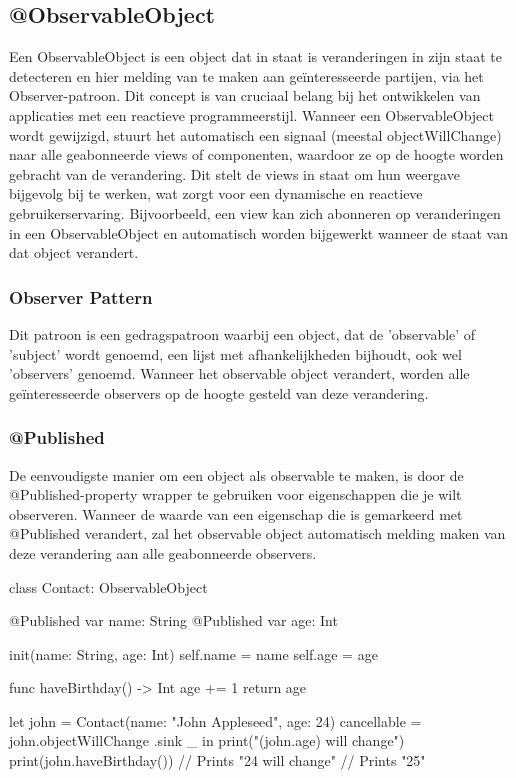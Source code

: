 \subsection{@ObservableObject}
\autocite{AppleObservableObject} Een ObservableObject is een object dat in staat is veranderingen in zijn staat te detecteren en hier melding van te maken aan geïnteresseerde partijen, via het Observer-patroon. Dit concept is van cruciaal belang bij het ontwikkelen van applicaties met een reactieve programmeerstijl. Wanneer een ObservableObject wordt gewijzigd, stuurt het automatisch een signaal (meestal objectWillChange) naar alle geabonneerde views of componenten, waardoor ze op de hoogte worden gebracht van de verandering. Dit stelt de views in staat om hun weergave bijgevolg bij te werken, wat zorgt voor een dynamische en reactieve gebruikerservaring. Bijvoorbeeld, een view kan zich abonneren op veranderingen in een ObservableObject en automatisch worden bijgewerkt wanneer de staat van dat object verandert.

\subsubsection{Observer Pattern}
\autocite{MediumDesignPatterns} Dit patroon is een gedragspatroon waarbij een object, dat de 'observable' of 'subject' wordt genoemd, een lijst met afhankelijkheden bijhoudt, ook wel 'observers' genoemd. Wanneer het observable object verandert, worden alle geïnteresseerde observers op de hoogte gesteld van deze verandering.

\subsubsection{@Published}
\autocite{ApplePublished} De eenvoudigste manier om een object als observable te maken, is door de @Published-property wrapper te gebruiken voor eigenschappen die je wilt observeren. Wanneer de waarde van een eigenschap die is gemarkeerd met @Published verandert, zal het observable object automatisch melding maken van deze verandering aan alle geabonneerde observers.

\begin{swift}[caption=Example of implemented Observable Pattern \autocite{AppleObservableObject}, label=observable_example]
class Contact: ObservableObject {
    @Published var name: String
    @Published var age: Int
    
    
    init(name: String, age: Int) {
        self.name = name
        self.age = age
    }
    
    
    func haveBirthday() -> Int {
        age += 1
        return age
    }
}


let john = Contact(name: "John Appleseed", age: 24)
cancellable = john.objectWillChange
.sink { _ in
    print("(john.age) will change")
}
print(john.haveBirthday())
// Prints "24 will change"
// Prints "25"
\end{swift}

